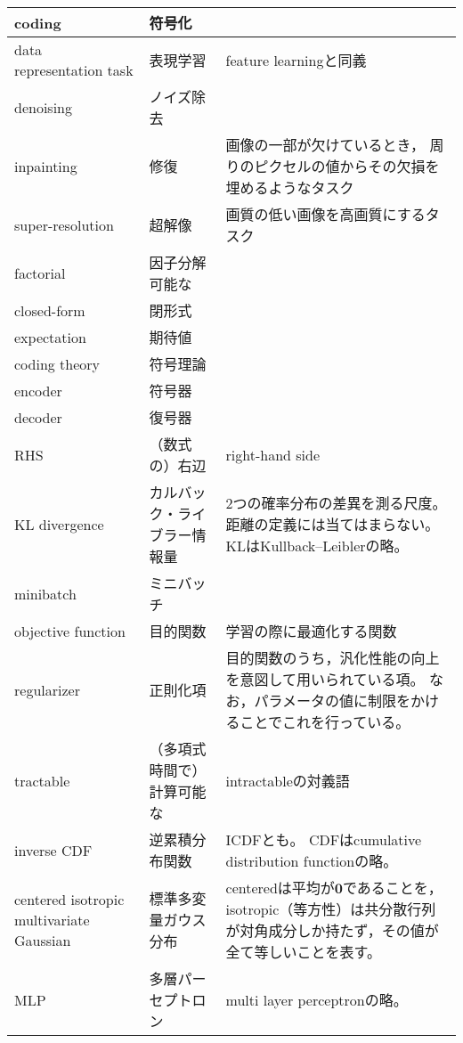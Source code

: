 \documentclass[dvipdfmx, fleqn]{jsarticle}
\begin{document}
\begin{longtable}{p{4cm}p{4cm}p{7cm}}
            \tabularnewline \hline
        coding
            & 符号化
            & 
            \tabularnewline \hline
        data representation task
            & 表現学習
            & feature learningと同義
            \tabularnewline \hline
        denoising
            & ノイズ除去
            & 
            \tabularnewline \hline
        inpainting
            & 修復
            & 画像の一部が欠けているとき，
            周りのピクセルの値からその欠損を埋めるようなタスク
            \tabularnewline \hline
        super-resolution
            & 超解像
            & 画質の低い画像を高画質にするタスク
            \tabularnewline \hline
        factorial
            & 因子分解可能な
            & 
            \tabularnewline \hline
        closed-form
            & 閉形式
            & 
            \tabularnewline \hline
        expectation
            & 期待値
            & 
            \tabularnewline \hline
        coding theory
            & 符号理論
            & 
            \tabularnewline \hline
        encoder
            & 符号器
            & 
            \tabularnewline \hline
        decoder
            & 復号器
            & 
            \tabularnewline \hline
        RHS
            & （数式の）右辺
            & right-hand side
            \tabularnewline \hline
        KL divergence
            & カルバック・ライブラー情報量
            & 2つの確率分布の差異を測る尺度。
            距離の定義には当てはまらない。
            KLはKullback–Leiblerの略。
            \tabularnewline \hline
        minibatch
            & ミニバッチ
            & 
            \tabularnewline \hline
        objective function
            & 目的関数
            & 学習の際に最適化する関数
            \tabularnewline \hline
        regularizer
            & 正則化項
            & 目的関数のうち，汎化性能の向上を意図して用いられている項。
            なお，パラメータの値に制限をかけることでこれを行っている。
            \tabularnewline \hline
        tractable
            & （多項式時間で）計算可能な
            & intractableの対義語
            \tabularnewline \hline
        inverse CDF
            & 逆累積分布関数
            & ICDFとも。
            CDFはcumulative distribution functionの略。
            \tabularnewline \hline
        centered isotropic multivariate Gaussian
            & 標準多変量ガウス分布
            & centeredは平均が\(\bm{0}\)であることを，isotropic（等方性）は共分散行列が対角成分しか持たず，その値が全て等しいことを表す。
            \tabularnewline \hline
        MLP
            & 多層パーセプトロン
            & multi layer perceptronの略。

\end{longtable}
\end{document}
